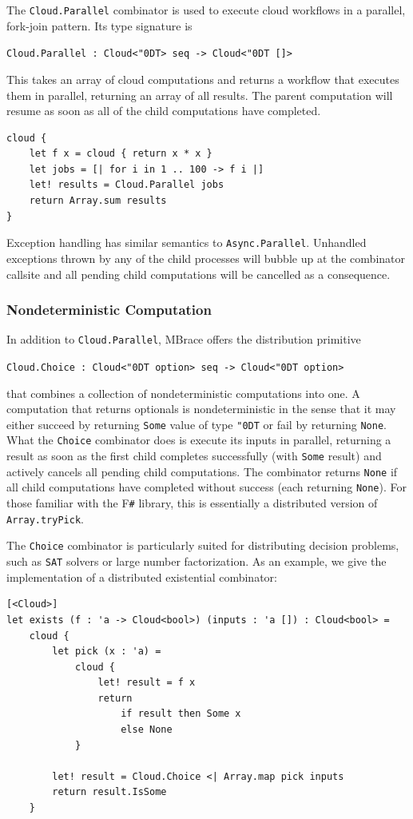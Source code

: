 \documentclass[9pt,a4paper]{article}
\newcommand{\mbrace}{MBrace}
\newcommand{\fsharp}{F\texttt \#}
\newcommand{\centertt}[1]{\begin{center}\texttt{#1}\end{center}}
\newcommand{\uq}{\char"0D}
\begin{document}
The \texttt{Cloud.Parallel} combinator is used to execute cloud workflows in a parallel, 
fork-join pattern. Its type signature is
\centertt{Cloud.Parallel : Cloud<\uq{}T> seq -> Cloud<\uq{}T []>}
This takes an array of cloud computations and returns a workflow that executes them
in parallel, returning an array of all results.
The parent computation will resume as soon as all of the child computations have completed.
\begin{lstlisting}
cloud {
    let f x = cloud { return x * x }
    let jobs = [| for i in 1 .. 100 -> f i |]   
    let! results = Cloud.Parallel jobs
    return Array.sum results
}
\end{lstlisting}
%
Exception handling has similar semantics to \texttt{Async.Parallel}.
Unhandled exceptions thrown by any of the child processes will
bubble up at the combinator callsite and all pending child computations
will be cancelled as a consequence.

\subsubsection*{Nondeterministic Computation}
%
In addition to \texttt{Cloud.Parallel}, \mbrace{} offers the distribution primitive
\centertt{Cloud.Choice : Cloud<\uq{}T option> seq -> Cloud<\uq{}T option> }
that combines a collection of nondeterministic computations into one.
A computation that returns optionals is nondeterministic in the sense that
it may either succeed by returning \texttt{Some} value of type \texttt{\uq{}T} or
fail by returning \texttt{None}.
What the \texttt{Choice} combinator does is execute its inputs in parallel,
returning a result as soon as the first child completes successfully 
(with \texttt{Some} result) and actively cancels all pending child computations.
The combinator returns \texttt{None} if all child computations have completed
without success (each returning \texttt{None}).
For those familiar with the \fsharp{} library, this is essentially a distributed
version of \texttt{Array.tryPick}.

The \texttt{Choice} combinator is particularly suited for distributing decision problems,
such as \texttt{SAT} solvers or large number factorization.
As an example, we give the implementation of a distributed existential combinator:
\begin{lstlisting}
[<Cloud>]
let exists (f : 'a -> Cloud<bool>) (inputs : 'a []) : Cloud<bool> =
    cloud {
        let pick (x : 'a) =
            cloud {
                let! result = f x
                return
                    if result then Some x
                    else None
            }

        let! result = Cloud.Choice <| Array.map pick inputs
        return result.IsSome 
    }
\end{lstlisting}
\end{document}
